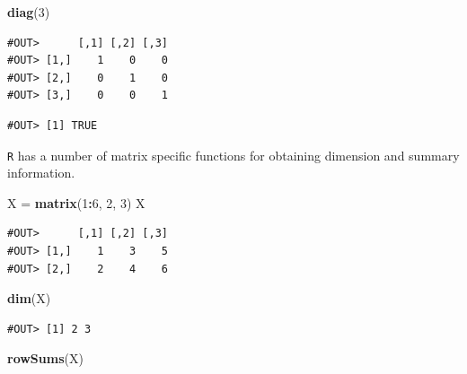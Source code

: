 \documentclass[]{book}
\newenvironment{Shaded}{\begin{snugshade}}{\end{snugshade}}
\newcommand{\KeywordTok}[1]{\textcolor[rgb]{0.13,0.29,0.53}{\textbf{#1}}}
\newcommand{\DecValTok}[1]{\textcolor[rgb]{0.00,0.00,0.81}{#1}}
\newcommand{\StringTok}[1]{\textcolor[rgb]{0.31,0.60,0.02}{#1}}
\newcommand{\OperatorTok}[1]{\textcolor[rgb]{0.81,0.36,0.00}{\textbf{#1}}}
\newcommand{\NormalTok}[1]{#1}
\theoremstyle{definition}
\theoremstyle{definition}
\theoremstyle{definition}
\theoremstyle{remark}
\begin{document}
\begin{Shaded}
\begin{Highlighting}[]
\KeywordTok{diag}\NormalTok{(}\DecValTok{3}\NormalTok{)}
\end{Highlighting}
\end{Shaded}

\begin{verbatim}
#OUT>      [,1] [,2] [,3]
#OUT> [1,]    1    0    0
#OUT> [2,]    0    1    0
#OUT> [3,]    0    0    1
\end{verbatim}

\begin{Shaded}
\end{Shaded}

\begin{verbatim}
#OUT> [1] TRUE
\end{verbatim}

\texttt{R} has a number of matrix specific functions for obtaining
dimension and summary information.

\begin{Shaded}
\begin{Highlighting}[]
\NormalTok{X =}\StringTok{ }\KeywordTok{matrix}\NormalTok{(}\DecValTok{1}\OperatorTok{:}\DecValTok{6}\NormalTok{, }\DecValTok{2}\NormalTok{, }\DecValTok{3}\NormalTok{)}
\NormalTok{X}
\end{Highlighting}
\end{Shaded}

\begin{verbatim}
#OUT>      [,1] [,2] [,3]
#OUT> [1,]    1    3    5
#OUT> [2,]    2    4    6
\end{verbatim}

\begin{Shaded}
\begin{Highlighting}[]
\KeywordTok{dim}\NormalTok{(X)}
\end{Highlighting}
\end{Shaded}

\begin{verbatim}
#OUT> [1] 2 3
\end{verbatim}

\begin{Shaded}
\begin{Highlighting}[]
\KeywordTok{rowSums}\NormalTok{(X)}
\end{Highlighting}
\end{Shaded}
\end{document}

